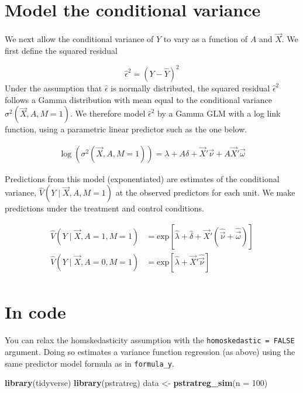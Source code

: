 \documentclass[
]{book}
\newenvironment{Shaded}{\begin{snugshade}}{\end{snugshade}}
\newcommand{\AttributeTok}[1]{\textcolor[rgb]{0.13,0.29,0.53}{#1}}
\newcommand{\DecValTok}[1]{\textcolor[rgb]{0.00,0.00,0.81}{#1}}
\newcommand{\FunctionTok}[1]{\textcolor[rgb]{0.13,0.29,0.53}{\textbf{#1}}}
\newcommand{\NormalTok}[1]{#1}
\newcommand{\OtherTok}[1]{\textcolor[rgb]{0.56,0.35,0.01}{#1}}
\begin{document}
\hypertarget{model-the-conditional-variance}{%
\section{Model the conditional variance}\label{model-the-conditional-variance}}

We next allow the conditional variance of \(Y\) to vary as a function of \(A\) and \(\vec{X}\). We first define the squared residual

\[\hat\epsilon^2 = \left(Y - \hat{Y}\right)^2\]
Under the assumption that \(\hat\epsilon\) is normally distributed, the squared residual \(\hat\epsilon^2\) follows a Gamma distribution with mean equal to the conditional variance \(\sigma^2(\vec{X},A,M=1)\). We therefore model \(\hat\epsilon^2\) by a Gamma GLM with a log link function, using a parametric linear predictor such as the one below.

\[\begin{aligned}
\log(\sigma^2(\vec{X},A,M=1)) = \lambda + A\delta  + \vec{X}'\vec\nu + A\vec{X}'\vec\omega
\end{aligned}\]

Predictions from this model (exponentiated) are estimates of the conditional variance, \(\hat{V}(Y\mid \vec{X},A,M=1)\) at the observed predictors for each unit. We make predictions under the treatment and control conditions.

\[\begin{aligned}
\hat{V}(Y\mid \vec{X},A = 1,M=1) &= \text{exp}\left[\hat\lambda + \hat\delta  + \vec{X}'\left(\hat{\vec\nu} + \hat{\vec\omega}\right)\right] \\
\hat{V}(Y\mid \vec{X},A = 0,M=1) &= \text{exp}\left[\hat\lambda + \vec{X}'\hat{\vec\nu}\right] \\
\end{aligned}\]

\hypertarget{in-code}{%
\section{In code}\label{in-code}}

You can relax the homskedasticity assumption with the \texttt{homoskedastic\ =\ FALSE} argument. Doing so estimates a variance function regression (as above) using the same predictor model formula as in \texttt{formula\_y}.

\begin{Shaded}
\begin{Highlighting}[]
\FunctionTok{library}\NormalTok{(tidyverse)}
\FunctionTok{library}\NormalTok{(pstratreg)}
\NormalTok{data }\OtherTok{\textless{}{-}} \FunctionTok{pstratreg\_sim}\NormalTok{(}\AttributeTok{n =} \DecValTok{100}\NormalTok{)}
\end{Highlighting}
\end{Shaded}
\end{document}
